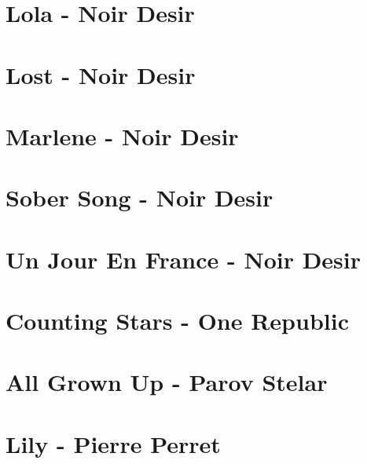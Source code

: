 \documentclass[11pt]{article}
\begin{document}
\section*{Lola - Noir Desir}
\begin{guitar}

\end{guitar}




\section{Lost - Noir Desir}


\section{Marlene - Noir Desir}
\begin{guitar}

\end{guitar}

\section{Sober Song - Noir Desir}



\section*{Un Jour En France - Noir Desir}
\begin{guitar}

\end{guitar}

\section{Counting Stars - One Republic}
\begin{guitar}

\end{guitar}

\section{All Grown Up - Parov Stelar}
\begin{guitar}

\end{guitar}


\section{Lily - Pierre Perret}

\end{document}
